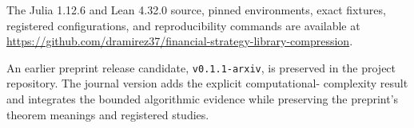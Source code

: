 \documentclass[pdflatex,sn-mathphys-ay]{sn-jnl}
\numberwithin{equation}{section}
\theoremstyle{aor-definition}
\theoremstyle{aor-theorem}
\begin{document}
The Julia 1.12.6 and Lean 4.32.0 source, pinned environments, exact fixtures,
registered configurations, and reproducibility commands are available at
\url{https://github.com/dramirez37/financial-strategy-library-compression}.

\AORAuthorContributionStatement

An earlier preprint release candidate, \texttt{v0.1.1-arxiv}, is preserved in
the project repository. The journal version adds the explicit computational-
complexity result and integrates the bounded algorithmic evidence while
preserving the preprint's theorem meanings and registered studies.


\end{document}
